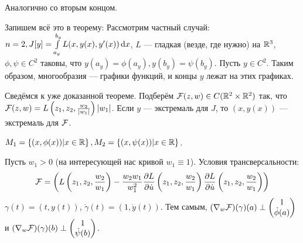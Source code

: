 \documentclass[a4paper]{article}
\begin{document}
    Аналогично со вторым концом.

    Запишем всё это в теорему:
    Рассмотрим частный случай: $n = 2, J[y] = \int\limits_{a_y}^{b_y} L(x, y(x), y'(x))\operatorname{d}\! x$, $L$ --- гладкая (везде, где нужно) на $\mathbb{R}^3$, $\phi, \psi \in C^2$ таковы, что $y(a_y) = \phi(a_y), y(b_y) = \psi(b_y)$.
    Пусть $y \in C^2$.
    Таким образом, многообразия --- графики функций, и концы $y$ лежат на этих графиках.

    Сведёмся к уже доказанной теореме.
    Подберём $\mathcal{F}(z, w) \in C(\mathbb{R}^2 \times \mathbb{R}^2)$ так, что $\mathcal{F}(z, w) = L\left(z_1, z_2, \frac{w_2}{|w_1|}\right)|w_1|$. Если $y$ --- экстремаль для $J$, то $(x, y(x))$ --- экстремаль для $\mathcal{F}$.

    $M_1 = \left\{(x, \phi(x))\middle|x \in \mathbb{R}\right\}, M_2 = \left\{(x, \psi(x))\middle|x \in \mathbb{R}\right\}$.

    Пусть $w_1 > 0$ (на интересующей нас кривой $w_1 \equiv 1$).
    Условия трансверсальности: \[\mathcal{F} = \left(L\left(z_1, z_2, \frac{w_2}{w_1}\right) - \frac{w_2 w_1}{w_1^2}\frac{\partial L}{\partial \dot{u}}\left(z_1, z_2, \frac{w_2}{w_1}\right) \\ \frac{\partial L}{\partial \dot{u}}\left(z_1, z_2, \frac{w_2}{w_1}\right)\right)\]
    $\gamma(t) = (t, y(t))$, $\dot{\gamma}(t) = (1, \dot{y}(t))$.
    Тем самым, $(\nabla_w\mathcal{F})(\gamma)(a) \perp \begin{pmatrix}1 \\ \dot{\phi}(a)\end{pmatrix}$ и $(\nabla_w\mathcal{F})(\gamma)(b) \perp \begin{pmatrix}1 \\ \dot{\psi}(b)\end{pmatrix}$.
\end{document}
